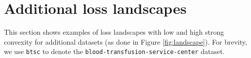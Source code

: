\section{Additional loss landscapes}
\label{sec:app:landscapes}

This section shows examples of loss landscapes with low and high strong convexity for additional datasets (as done in Figure \ref{fig:landscape}). For brevity, we use {\tt btsc} to denote the {\tt blood-transfusion-service-center} dataset.

\begin{table}[bh!]
    \centering
    \caption{Details of configurations and performance for landscapes of Figure \ref{fig:landscapes-all}. BS = batch size; $\alpha$ = $L_2$ regularization factor. Acc and AUC show training accuracy and AUC, and generalization error in parentheses. Datasets where the sharper landscapes outperformed the flatter minima are in red.}
    \label{tab:landscapes}


\end{table}
